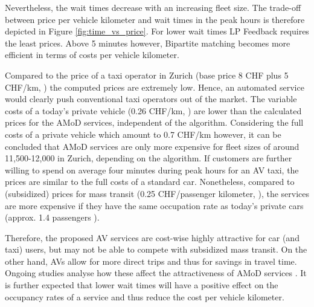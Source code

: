 Nevertheless, the wait times decrease with an increasing fleet size. The trade-off
between price per vehicle kilometer and wait times in the peak hours is therefore depicted in
Figure \ref{fig:time_vs_price}. For lower wait times LP Feedback requires the
least prices. Above 5 minutes however, Bipartite matching becomes more efficient
in terms of costs per vehicle kilometer.


Compared to the price of a taxi operator in Zurich (base price 8 CHF plus 5 CHF/km, \cite{StadtZurich2014})
the computed prices are extremely low. Hence, an automated service would clearly
push conventional taxi operators out of the market. The variable costs of a today's
private vehicle (0.26 CHF/km, \cite{TCS2016}) are lower than the calculated prices for the AMoD services,
independent of the algorithm. Considering the full costs of a private vehicle which amount to 0.7 CHF/km \cite{TCS2016} however, it can be concluded that AMoD services are only more expensive for fleet sizes of around 11,500-12,000
in Zurich, depending on the algorithm. If customers are further willing to spend on average four minutes
during peak hours for an AV taxi, the prices are similar to the full costs of a standard car.
Nonetheless, compared to (subsidized) prices for mass transit (0.25 CHF/passenger kilometer, \cite{Bosch2016a}), the services are more expensive if they have the same occupation rate as today's private cars (approx. 1.4 passengers \cite{Bosch2016a}).

Therefore, the proposed AV services are cost-wise highly attractive for car (and taxi) users, but may
not be able to compete with subsidized mass transit. On the other hand, AVs
allow for more direct trips and thus for savings in travel time. Ongoing studies analyse
how these affect the attractiveness of AMoD services \cite{ Becker2017}. It is further expected
that lower wait times will have a positive effect on the occupancy rates of a service
and thus reduce the cost per vehicle kilometer.


